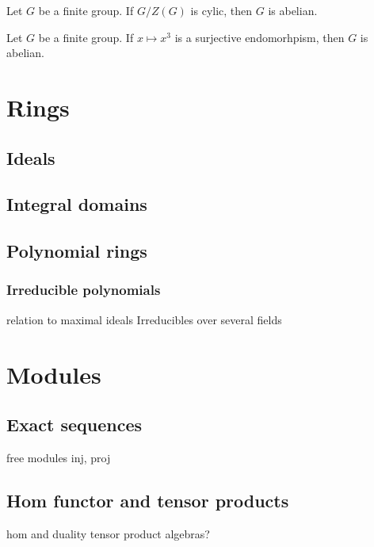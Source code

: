 \documentclass{../note}
\begin{document}
\begin{prb}
Let $G$ be a finite group.
If $G/Z(G)$ is cylic, then $G$ is abelian.
\end{prb}

\begin{prb}
Let $G$ be a finite group.
If $x\mapsto x^3$ is a surjective endomorhpism, then $G$ is abelian.
\end{prb}









\part{Rings}
\chapter{Ideals}
\chapter{Integral domains}


\chapter{Polynomial rings}
\section{Irreducible polynomials}
relation to maximal ideals
Irreducibles over several fields













\part{Modules}

\chapter{Exact sequences}
free modules
inj, proj

\chapter{Hom functor and tensor products}
hom and duality
tensor product
algebras?
\end{document}
